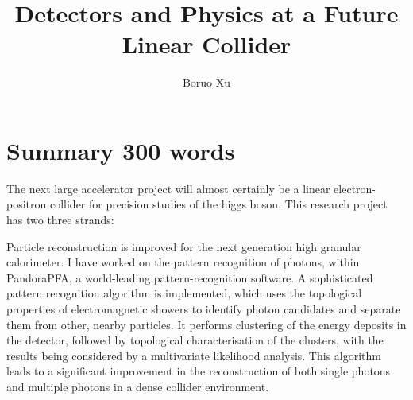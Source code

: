 \documentclass[11pt,tightenlines,print,twoside,onecolumn,aps,amsmath,amssymb]{revtex4}
\newcommand{\tstamp}{\today}
\begin{document}
\chead[\fancyplain{}{}]                 {\fancyplain{}{}}
\lfoot[\fancyplain{}{}]                 {\fancyplain{}{}}   %
\cfoot[\fancyplain{\thepage}{}]         {\fancyplain{\thepage}{}}
\rfoot[\fancyplain{}{}]  {\fancyplain{}{}}    %

\title{Detectors and Physics at a Future Linear Collider}
\author{Boruo Xu}

\begin{abstract}




\end{abstract}

\maketitle

\section{Summary 300 words}

The next large accelerator project will almost certainly be a linear electron-positron collider for precision studies of the higgs boson. This research project has two three strands: 

 Particle reconstruction  is improved for the next generation high granular calorimeter. I have worked on the pattern recognition of photons, within PandoraPFA, a world-leading pattern-recognition software. A sophisticated pattern recognition algorithm is implemented, which uses the topological properties of electromagnetic showers to identify photon candidates and separate them from other, nearby particles. It performs clustering of the energy deposits in the detector, followed by topological characterisation of the clusters, with the results being considered by a multivariate likelihood analysis. This algorithm leads to a significant improvement in the reconstruction of both single photons and multiple photons in a dense collider environment.
\end{document}
